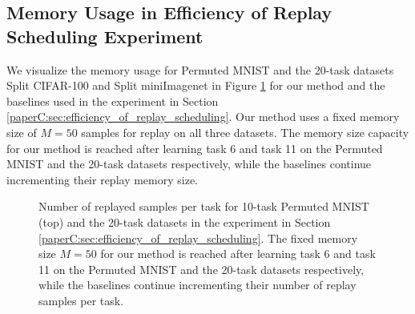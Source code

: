 \subsection{Memory Usage in Efficiency of Replay Scheduling Experiment}\label{paperC:app:additional_figures}

We visualize the memory usage for Permuted MNIST and the 20-task datasets Split CIFAR-100 and Split miniImagenet in Figure \ref{fig:memory_usage_10_and_20task_datasets} for our method and the baselines used in the experiment in Section \ref{paperC:sec:efficiency_of_replay_scheduling}. Our method uses a fixed memory size of $M=50$ samples for replay on all three datasets. The memory size capacity for our method is reached after learning task 6 and task 11 on the Permuted MNIST and the 20-task datasets respectively, while the baselines continue incrementing their replay memory size.

\begin{figure}[h]
	\centering
	\vspace{-1mm}
	\setlength{\figwidth}{0.75\textwidth}
	\setlength{\figheight}{.20\textheight}
	
	\vspace{-3mm}
	\caption{Number of replayed samples per task for 10-task Permuted MNIST (top) and the 20-task datasets in the experiment in Section \ref{paperC:sec:efficiency_of_replay_scheduling}. The fixed memory size $M=50$ for our method is reached after learning task 6 and task 11 on the Permuted MNIST and the 20-task datasets respectively, while the baselines continue incrementing their number of replay samples per task.}
	\label{fig:memory_usage_10_and_20task_datasets}
\end{figure}
